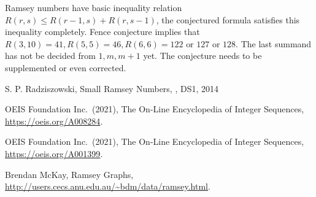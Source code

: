 \documentclass[12pt]{article}
\begin{document}
Ramsey numbers have basic inequality relation $R(r,s)\leq R(r-1,s)+R(r,s-1)$, 
the conjectured formula satisfies this inequality completely. 
Fence conjecture implies that $R(3,10)=41, R(5,5)=46, R(6,6)=122 \text{ or } 127 \text{ or } 128$.
The last summand has not be decided from ${1,m,m+1}$ yet.   
The conjecture needs to be supplemented or even corrected.  



\begin{thebibliography}{99}

S. P. Radziszowski,
\newblock Small Ramsey Numbers,
, DS1, 2014

OEIS Foundation Inc.~(2021), The On-Line Encyclopedia of Integer Sequences, \url{https://oeis.org/A008284}.

OEIS Foundation Inc.~(2021), The On-Line Encyclopedia of Integer Sequences, \url{https://oeis.org/A001399}.

Brendan McKay,
\newblock Ramsey Graphs, \url{http://users.cecs.anu.edu.au/~bdm/data/ramsey.html}.

\end{thebibliography}
\end{document}
